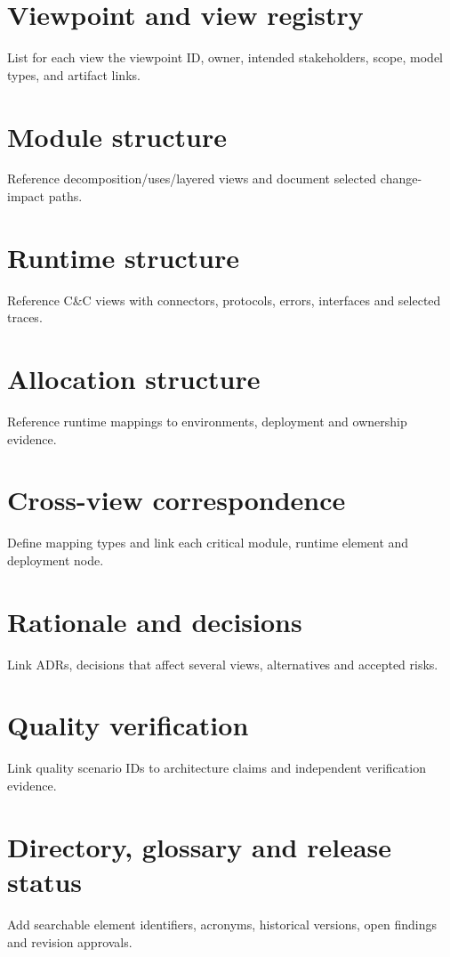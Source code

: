 \documentclass[10pt,letterpaper]{article}
\begin{document}
\section{Viewpoint and view registry}
List for each view the viewpoint ID, owner, intended stakeholders, scope, model types, and artifact links.

\section{Module structure}
Reference decomposition/uses/layered views and document selected change-impact paths.

\section{Runtime structure}
Reference C\&C views with connectors, protocols, errors, interfaces and selected traces.

\section{Allocation structure}
Reference runtime mappings to environments, deployment and ownership evidence.

\section{Cross-view correspondence}
Define mapping types and link each critical module, runtime element and deployment node.

\section{Rationale and decisions}
Link ADRs, decisions that affect several views, alternatives and accepted risks.

\section{Quality verification}
Link quality scenario IDs to architecture claims and independent verification evidence.

\section{Directory, glossary and release status}
Add searchable element identifiers, acronyms, historical versions, open findings and revision approvals.
\end{document}
